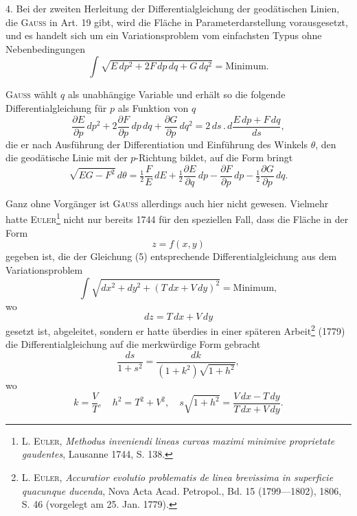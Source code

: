 \clearpage\begingroup\NoSourceHead{}
\renewcommand{\thefootnote}{\arabic{footnote})}\setcounter{footnote}{2}
\begin{center}\end{center}
\noindent\hspace*{\parindent}4. Bei der zweiten Herleitung der Differentialgleichung der geodätischen
Linien, die \textsc{Gauss} in Art. 19 gibt, wird die Fläche in Parameterdarstellung vorausgesetzt,
und es handelt sich um ein Variationsproblem vom einfachsten
Typus ohne Nebenbedingungen
\begin{equation*}\tag{4}
\int\sqrt{E\,dp^2+2F\,dp\,dq+G\,dq^2}=\text{Minimum.}
\end{equation*}

\textsc{Gauss} wählt $q$ als unabhängige Variable und erhält so die folgende Differentialgleichung
für $p$ als Funktion von $q$
\begin{equation*}\tag{5}
\frac{\partial E}{\partial p}\,dp^2+2\frac{\partial F}{\partial p}\,dp\,dq+\frac{\partial G}{\partial p}\,dq^2
=2\,ds\mathpunct{.}d\frac{E\,dp+F\,dq}{ds},
\end{equation*}
die er nach Ausführung der Differentiation und Einführung des Winkels $\theta$,
den die geodätische Linie mit der $p$-Richtung bildet, auf die Form bringt
\begin{equation*}\tag{6}
\sqrt{EG-F^2}\,d\theta=\tfrac12\frac{F}{E}\,dE+\tfrac12\frac{\partial E}{\partial q}\,dp
-\frac{\partial F}{\partial p}\,dp-\tfrac12\frac{\partial G}{\partial p}\,dq.
\end{equation*}

Ganz ohne Vorgänger ist \textsc{Gauss} allerdings auch hier nicht gewesen. Vielmehr
hatte \textsc{Euler}\footnote{L. \textsc{Euler}, \textit{Methodus inveniendi lineas curvas maximi minimive proprietate gaudentes}, Lausanne
1744, S. 138.} nicht nur bereits 1744 für den speziellen Fall, dass die
Fläche in der Form
\[
z=f(x,y)
\]
gegeben ist, die der Gleichung (5) entsprechende Differentialgleichung aus
dem Variationsproblem
\[
\int\sqrt{dx^2+dy^2+(T\,dx+V\,dy)^2}=\text{Minimum},
\]
wo
\[
dz=T\,dx+V\,dy
\]
gesetzt ist, abgeleitet, sondern er hatte überdies in einer späteren Arbeit\footnote{L. \textsc{Euler}, \textit{Accuratior evolutio problematis de linea brevissima in superficie quacunque ducenda},
Nova Acta Acad. Petropol., Bd. 15 (1799—1802), 1806, S. 46 (vorgelegt am 25. Jan. 1779).}
(1779) die Differentialgleichung auf die merkwürdige Form gebracht
\begin{equation*}\tag{7}
\frac{ds}{1+s^2}=\frac{dk}{(1+k^2)\sqrt{1+h^2}},
\end{equation*}
\clearpage{}
\noindent wo
\[
k=\frac{V}{T},\quad h^2=T^2+V^2,\quad s\sqrt{1+h^2}=\frac{V\,dx-T\,dy}{T\,dx+V\,dy}.
\]

